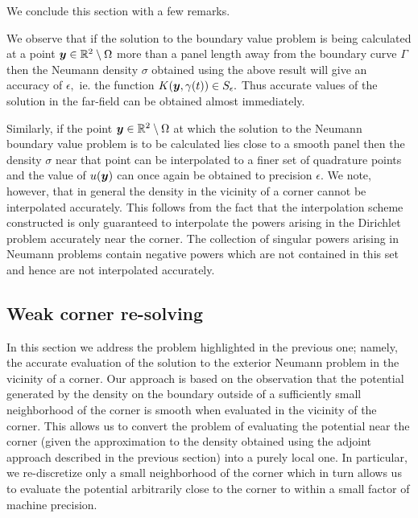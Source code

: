 We conclude this section with a few remarks. 

\begin{remark1}
We observe that if the solution to the boundary value problem is being calculated at a point $\boldsymbol{y} \in \mathbb{R}^2\setminus \Omega$ more than a panel length away from the boundary curve $\Gamma$ then the Neumann density $\sigma$ obtained using the above result will give an accuracy of $\epsilon,$ ie. the function $K(\boldsymbol{y},\gamma(t)) \in S_\epsilon.$ Thus accurate values of the solution in the far-field can be obtained almost immediately.
\end{remark1}
\begin{remark1}
Similarly, if the point $\boldsymbol{y} \in \mathbb{R}^2 \setminus \Omega$ at which the solution to the Neumann boundary value problem is to be calculated lies close to a smooth panel then the density $\sigma$ near that point can be interpolated to a finer set of quadrature points and the value of $u(\boldsymbol{y})$ can once again be obtained to precision $\epsilon.$ We note, however, that in general the density in the vicinity of a corner cannot be interpolated accurately. This follows from the fact that the interpolation scheme constructed is only guaranteed to interpolate the powers arising in the Dirichlet problem accurately near the corner. The collection of singular powers arising in Neumann problems contain negative powers which are not contained in this set and hence are not interpolated accurately.
\end{remark1}

\subsection{Weak corner re-solving}
In this section we address the problem highlighted in the previous one; namely, the accurate evaluation of the solution to the exterior Neumann problem in the vicinity of a corner. Our approach is based on the observation that the potential generated by the density on the boundary outside of a sufficiently small neighborhood of the corner is smooth when evaluated in the vicinity of the corner. This allows us to convert the problem of evaluating the potential near the corner (given the approximation to the density obtained using the adjoint approach described in the previous section) into a purely local one. In particular, we re-discretize only a small neighborhood of the corner which in turn allows us to evaluate the potential arbitrarily close to the corner to within a small factor of machine precision. 

